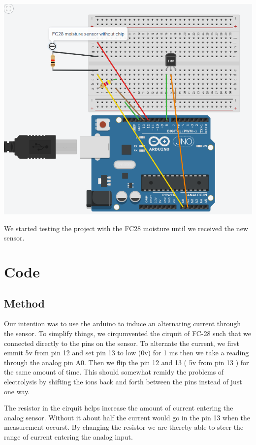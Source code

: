\documentclass{article}
\begin{document}
\includegraphics[scale = 0.50]{FC-28-Diagram.PNG}


We started testing the project with the FC28 moisture until we received the new sensor.

\section{Code}

\subsection{Method}

Our intention was to use the arduino to induce an alternating current through the sensor. To simplify things, we cirqumvented the cirquit of FC-28 such that we connected directly to the pins on the sensor. To alternate the current, we first emmit 5v from pin 12 and set pin 13 to low (0v) for 1 ms then we take a reading through the analog pin A0. Then we flip the pin 12 and 13 ( 5v from pin 13 ) for the same amount of time. This should somewhat remidy the problems of electrolysis by shifting the ions back and forth between the pins instead of just one way.

The resistor in the cirquit helps increase the amount of current entering the analog sensor. Without it about half the current would go in the pin 13 when the measurement occurst. By changing the resistor we are thereby able to steer the range of current entering the analog input.
\end{document}
